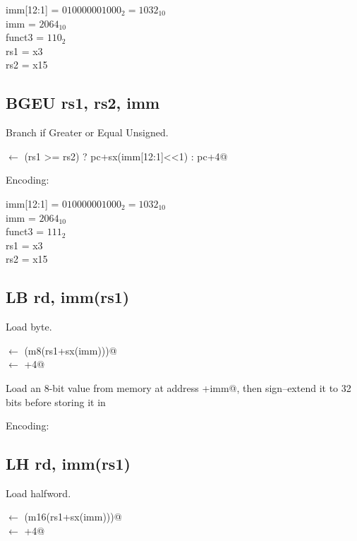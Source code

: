 imm[12:1] = $010000001000_2 = 1032_{10}$\\
imm = $2064_{10}$\\
funct3 = $110_2$\\
rs1 = x3\\
rs2 = x15


\subsection{BGEU rs1, rs2, imm}

Branch if Greater or Equal Unsigned.

\verb@pc@ $\leftarrow$ \verb@(rs1 >= rs2) ? pc+sx(imm[12:1]<<1) : pc+4@

Encoding:


imm[12:1] = $010000001000_2 = 1032_{10}$\\
imm = $2064_{10}$\\
funct3 = $111_2$\\
rs1 = x3\\
rs2 = x15

\subsection{LB rd, imm(rs1)}

Load byte.

\verb@rd@ $\leftarrow$ \verb@sx(m8(rs1+sx(imm)))@\\
\verb@pc@ $\leftarrow$ \verb@pc+4@

Load an 8-bit value from memory at address +imm@, then 
sign--extend it to 32 bits before storing it in \verb@rd@


Encoding:


\subsection{LH rd, imm(rs1)}

Load halfword.

\verb@rd@ $\leftarrow$ \verb@sx(m16(rs1+sx(imm)))@\\
\verb@pc@ $\leftarrow$ \verb@pc+4@

